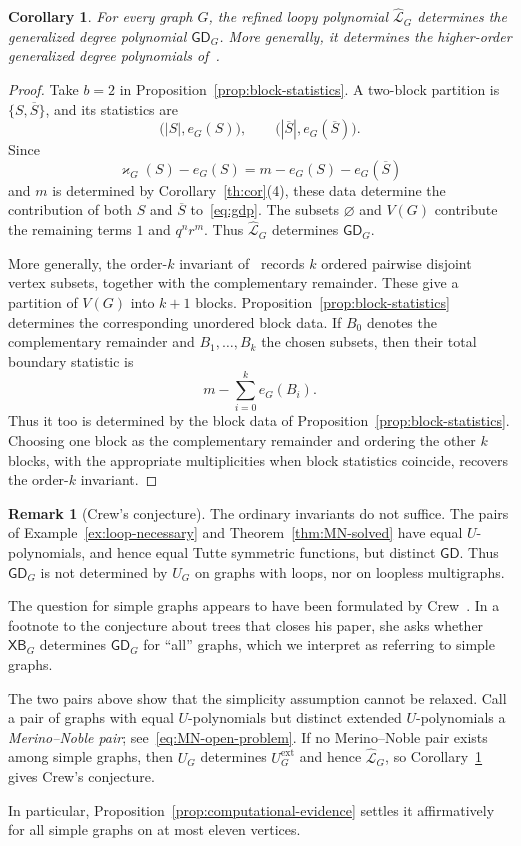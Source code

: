 \documentclass[11pt]{article}
\theoremstyle{plain}
\newtheorem{corollary}[theorem]{Corollary}
\theoremstyle{definition}
\newtheorem{remark}[theorem]{Remark}
\renewcommand{\mathcal}{\mathscr}
\newcommand{\LL}{\mathcal{L}}    %
\newcommand{\GD}{\mathsf{GD}}    %
\newcommand{\XB}{\mathsf{XB}} %
\newcommand{\kp}{\varkappa}
\newcommand{\ext}{\mathrm{ext}}
\numberwithin{equation}{section}
\begin{document}
\begin{corollary}\label{cor:gdp}
For every graph $G$, the refined loopy polynomial $\widehat{\LL}_G$
determines the generalized degree polynomial $\GD_G$.  More generally, it
determines the higher-order generalized degree polynomials of~\cite{LT}.
\end{corollary}

\begin{proof}
Take $b=2$ in Proposition~\ref{prop:block-statistics}.  A two-block
partition is $\{S,\overline S\}$, and its statistics are
\[
   \bigl(|S|,e_G(S)\bigr), \qquad  \bigl(|\overline S|,e_G(\overline S)\bigr).
\]
Since
\[
   \kp_G(S)-e_G(S)  =  m-e_G(S)-e_G(\overline S)
\]
and $m$ is determined by Corollary~\ref{th:cor}(4), these data determine
the contribution of both $S$ and $\overline S$ to~\eqref{eq:gdp}.
The subsets $\varnothing$ and $V(G)$ contribute the remaining terms
$1$ and $q^nr^m$.  Thus $\widehat{\LL}_G$ determines $\GD_G$.

More generally, the order-$k$ invariant of~\cite{LT} records $k$ ordered
pairwise disjoint vertex subsets, together with the complementary remainder.
These give a partition of $V(G)$ into $k+1$ blocks.
Proposition~\ref{prop:block-statistics} determines the corresponding unordered block data.
%
If $B_0$ denotes the complementary remainder and
$B_1,\ldots,B_k$ the chosen subsets, then their total boundary statistic is
\[
  m-\sum_{i=0}^k e_G(B_i).
\]
Thus it too is determined by the block data of
Proposition~\ref{prop:block-statistics}.  Choosing one block as the
complementary remainder and ordering the other $k$ blocks, with the
appropriate multiplicities when block statistics coincide, recovers the
order-$k$ invariant.
\end{proof}

\begin{remark}[Crew's conjecture]\label{rem:gdp-ordinary}
 The ordinary invariants do not suffice. The pairs of
Example~\ref{ex:loop-necessary} and Theorem~\ref{thm:MN-solved} have equal
$U$-polynomials, and hence equal Tutte symmetric functions, but distinct $\GD$.
Thus $\GD_G$ is not determined by $U_G$ on graphs with loops, nor on loopless multigraphs.

The question for simple graphs appears to have been formulated by
Crew~\cite{Crew}.  In a footnote to the conjecture about trees that closes
his paper, she asks whether $\XB_G$ determines $\GD_G$ for ``all'' graphs,
which we interpret as referring to simple graphs.

The two pairs above show that the simplicity assumption cannot be relaxed.
Call a pair of graphs with equal $U$-polynomials but distinct extended
$U$-polynomials a \emph{Merino--Noble pair}; see~\eqref{eq:MN-open-problem}.
If no Merino--Noble pair exists among simple graphs, then $U_G$ determines
$U^{\ext}_G$ and hence $\widehat{\LL}_G$, so
Corollary~\ref{cor:gdp} gives Crew's conjecture.

In particular, Proposition~\ref{prop:computational-evidence} settles it
affirmatively for all simple graphs on at most eleven vertices.
\end{remark}
\end{document}

